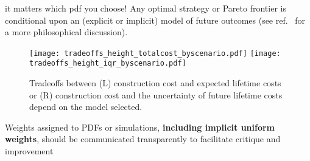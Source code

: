 \begin{block}{it matters which pdf you choose!}
    Any optimal strategy or Pareto frontier is conditional upon an (explicit or implicit) model of future outcomes (see ref.~\cite{gelman_philosophy:2013} for a more philosophical discussion).
    \begin{framed}
        \begin{figure}
            \centering
            \texttt{[image: tradeoffs\_height\_totalcost\_byscenario.pdf]}%
            \texttt{[image: tradeoffs\_height\_iqr\_byscenario.pdf]}
            \caption{
                Tradeoffs between (L) construction cost and expected lifetime costs or (R) construction cost and the uncertainty of future lifetime costs depend on the model selected.
            }
            \label{fig:tradeoffs}
        \end{figure}
    \end{framed}
    Weights assigned to PDFs or simulations, \textbf{including implicit uniform weights}, should be communicated transparently to facilitate critique and improvement
\end{block}